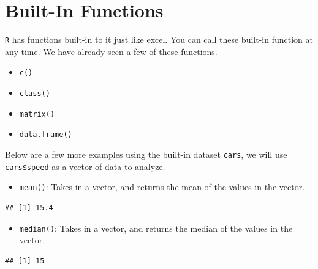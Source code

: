 \documentclass[
]{book}
\newenvironment{Shaded}{\begin{snugshade}}{\end{snugshade}}
\newcommand{\KeywordTok}[1]{\textcolor[rgb]{0.13,0.29,0.53}{\textbf{#1}}}
\newcommand{\NormalTok}[1]{#1}
\newcommand{\OperatorTok}[1]{\textcolor[rgb]{0.81,0.36,0.00}{\textbf{#1}}}
\providecommand{\tightlist}{%
  \setlength{\itemsep}{0pt}\setlength{\parskip}{0pt}}
\begin{document}
\hypertarget{built-in-functions}{%
\section{Built-In Functions}\label{built-in-functions}}

\texttt{R} has functions built-in to it just like excel. You can call these built-in function at any time. We have already seen a few of these functions.

\begin{itemize}
\tightlist
\item
  \texttt{c()}
\item
  \texttt{class()}
\item
  \texttt{matrix()}
\item
  \texttt{data.frame()}
\end{itemize}

Below are a few more examples using the built-in dataset \texttt{cars}, we will use \texttt{cars\$speed} as a vector of data to analyze.

\begin{itemize}
\tightlist
\item
  \texttt{mean()}: Takes in a vector, and returns the mean of the values in the vector.
\end{itemize}

\begin{Shaded}
\end{Shaded}

\begin{verbatim}
## [1] 15.4
\end{verbatim}

\begin{itemize}
\tightlist
\item
  \texttt{median()}: Takes in a vector, and returns the median of the values in the vector.
\end{itemize}

\begin{Shaded}
\end{Shaded}

\begin{verbatim}
## [1] 15
\end{verbatim}
\end{document}
